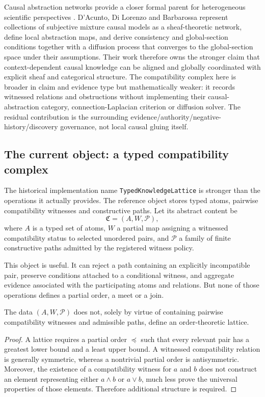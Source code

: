 Causal abstraction networks provide a closer formal parent for heterogeneous scientific perspectives \cite{dacunto2026can}. D'Acunto, Di Lorenzo and Barbarossa represent collections of subjective mixture causal models as a sheaf-theoretic network, define local abstraction maps, and derive consistency and global-section conditions together with a diffusion process that converges to the global-section space under their assumptions. Their work therefore owns the stronger claim that context-dependent causal knowledge can be aligned and globally coordinated with explicit sheaf and categorical structure. The compatibility complex here is broader in claim and evidence type but mathematically weaker: it records witnessed relations and obstructions without implementing their causal-abstraction category, connection-Laplacian criterion or diffusion solver. The residual contribution is the surrounding evidence/authority/negative-history/discovery governance, not local causal gluing itself.

\subsection{The current object: a typed compatibility complex}

The historical implementation name \texttt{TypedKnowledgeLattice} is stronger than the operations it actually provides. The reference object stores typed atoms, pairwise compatibility witnesses and constructive paths. Let its abstract content be
\[
\mathfrak C=(A,W,\mathcal P),
\]
where \(A\) is a typed set of atoms, \(W\) a partial map assigning a witnessed compatibility status to selected unordered pairs, and \(\mathcal P\) a family of finite constructive paths admitted by the registered witness policy.

This object is useful. It can reject a path containing an explicitly incompatible pair, preserve conditions attached to a conditional witness, and aggregate evidence associated with the participating atoms and relations. But none of those operations defines a partial order, a meet or a join.

\begin{proposition}
The data \((A,W,\mathcal P)\) does not, solely by virtue of containing pairwise compatibility witnesses and admissible paths, define an order-theoretic lattice.
\end{proposition}

\begin{proof}
A lattice requires a partial order \(\preceq\) such that every relevant pair has a greatest lower bound and a least upper bound. A witnessed compatibility relation is generally symmetric, whereas a nontrivial partial order is antisymmetric. Moreover, the existence of a compatibility witness for \(a\) and \(b\) does not construct an element representing either \(a\wedge b\) or \(a\vee b\), much less prove the universal properties of those elements. Therefore additional structure is required.
\end{proof}

